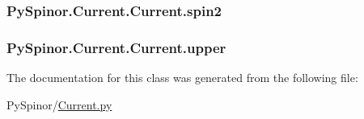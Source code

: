 \subsubsection[{spin2}]{\setlength{\rightskip}{0pt plus 5cm}Py\+Spinor.\+Current.\+Current.\+spin2}\label{class_py_spinor_1_1_current_1_1_current_afdb9923c8f80cc9031e8874a601f04a9}
\hypertarget{class_py_spinor_1_1_current_1_1_current_a1d7c4ad7c95a09c99a5ac532fb667da1}{}
\subsubsection[{upper}]{\setlength{\rightskip}{0pt plus 5cm}Py\+Spinor.\+Current.\+Current.\+upper}\label{class_py_spinor_1_1_current_1_1_current_a1d7c4ad7c95a09c99a5ac532fb667da1}


The documentation for this class was generated from the following file\+:\begin{DoxyCompactItemize}
\item 
Py\+Spinor/\hyperlink{_current_8py}{Current.\+py}\end{DoxyCompactItemize}
